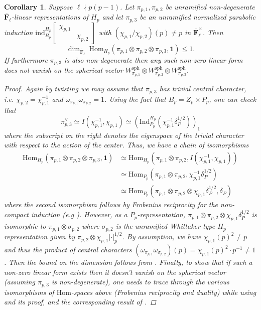\documentclass{amsart}%
\theoremstyle{plain}
\newtheorem{cor}[thm]{Corollary}
\theoremstyle{plain}
\theoremstyle{remark}
\begin{document}
 \begin{cor}
     Suppose $\ell\nmid p(p-1)$. Let $\pi_{p,1},\pi_{p,2}$ be unramified non-degenerate $\overline{\mathbf{F}}_\ell$-linear representations of $H_p$ and let $\pi_{p,3}$ be an unramified normalized parabolic induction  $\mathrm{ind}_{B_p}^{H_p}\left[\begin{smallmatrix}
         \chi_{p,1} \\
          & \chi_{p,2}
     \end{smallmatrix}\right]$ with $(\chi_{p,1}/\chi_{p,2})(p)\neq p$ in $\overline{\mathbf{F}}_\ell^\times$. Then
     $$\dim_{\overline{\mathbf{F}}_\ell}\ \mathrm{Hom}_{H_p}(\pi_{p,1}\otimes \pi_{p,2}\otimes \pi_{p,3},\mathbf{1})\leq 1.$$
     If furthermore $\pi_{p,3}$ is also non-degenerate then any such non-zero linear form does not vanish on the spherical vector $W_{\pi_{p,1}}^\mathrm{sph}\otimes W_{\pi_{p,2}}^\mathrm{sph}\otimes W_{\pi_{p,3}}^\mathrm{sph}$.
     \begin{proof}
          Again by twisting we may assume that $\pi_{p,3}$ has trivial central character, i.e. $\chi_{p,2}=\chi_{p,1}^{-1}$ and $\omega_{\pi_{p,1}}\omega_{\pi_{p,2}}=1$. Using the fact that $B_p=Z_p\times P_p$, one can check that $$\pi_{p,3}^\vee\simeq I(\chi_{p,1}^{-1},\chi_{p,1})\simeq \left(\mathrm{Ind}_{P_p}^{H_p}\left(\chi_{p,1}^{-1}\delta_P^{1/2}\right)\right)_1$$where the subscript on the right denotes the eigenspace of the trivial character with respect to the action of the center. Thus, we have a chain of isomorphisms
\begin{align}\label{eq: chain of isos}
     \mathrm{Hom}_{H_p}(\pi_{p,1}\otimes \pi_{p,2}\otimes \pi_{p,3},\mathbf{1})&\simeq\mathrm{Hom}_{H_p}\left(\pi_{p,1}\otimes \pi_{p,2}, I(\chi_{p,1}^{-1},\chi_{p,1})\right)\\
   \nonumber &\simeq \mathrm{Hom}_{P_p}\left(\pi_{p,1}\otimes \pi_{p,2},\chi_{p,1}^{-1}\delta_P^{1/2}\right)\\
\nonumber&\simeq\mathrm{Hom}_{P_p}\left(\pi_{p,1}\otimes\pi_{p,2}\otimes\chi_{p,1}\delta_P^{1/2},\delta_P\right)
\end{align}
where the second isomorphism follows by Frobenius reciprocity for the non-compact induction (e.g \cite[III $2.5$]{renard2010representations}). However, as a $P_p$-representation, $\pi_{p,1}\otimes\pi_{p,2}\otimes \chi_{p,1}\delta_P^{1/2}$ is isomorphic to $\pi_{p,1}\otimes\sigma_{p,2}$ where $\sigma_{p,2}$ is the unramified Whittaker type $H_p$-representation given by $\pi_{p,2}\otimes \chi_{p,1}|\cdot|_p^{1/2}$. By assumption, we have $\chi_{p,1}(p)^2\neq p$ and thus the product of central characters $(\omega_{\pi_{p,1}}\omega_{\sigma_{p,2}})(p)=\chi_{p,1}(p)^2\cdot p^{-1}\neq 1$. Then the bound on the dimension follows from . Finally, to show that if such a non-zero linear form exists then it doesn't vanish on the spherical vector (assuming $\pi_{p,3}$ is non-degenerate), one needs to trace through the various isomorphisms of $\mathrm{Hom}$-spaces above (Frobenius reciprocity and duality) while using \cite[Lemme $18$ part $(3)$]{vigneras1989representations} and its proof, and the corresponding result of .

\end{proof}
\end{cor}
\end{document}
